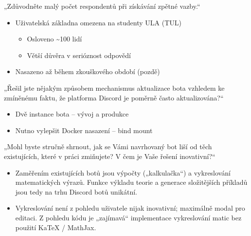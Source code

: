 \documentclass[FM]{tulpresentation} %
\begin{document}
	\TULendframe

	\begin{frame}
		\bigskip
		„Zdůvodněte malý počet respondentů při získávání zpětné vazby.“
		\bigskip
		\begin{itemize}
			\item Uživatelská základna omezena na studenty ULA (TUL)
			\begin{itemize}
				\item Osloveno \textasciitilde100 lidí
				\item Větší důvěra v serióznost odpovědí
			\end{itemize}
			\item Nasazeno až během zkouškového období (pozdě)
		\end{itemize}
	\end{frame}
	
	\begin{frame}
		\bigskip
		„Řešil jste nějakým způsobem mechanismus aktualizace bota vzhledem ke zmíněnému faktu, že platforma Discord je poměrně často aktualizována?“
		\bigskip
		\begin{itemize}
			\item Dvě instance bota – vývoj a produkce
			\item Nutno vylepšit Docker nasazení – bind mount
		\end{itemize}
	\end{frame}
	
	\begin{frame}
		\bigskip
		„Mohl byste stručně shrnout, jak se Vámi navrhovaný bot liší od těch existujících, které v práci zmiňujete? V
		čem je Vaše řešení inovativní?“
		\bigskip
		\begin{itemize}		
		\item Zaměřením existujících botů jsou výpočty („kalkulačka“) a vykreslování matematických výrazů. Funkce výkladu teorie a generace složitějších příkladů jsou tedy na trhu Discord botů unikátní.
		\item Vykreslování není z pohledu uživatele nijak inovativní; maximálně modal pro editaci. Z pohledu kódu je „zajímavá“ implementace vykreslování matic bez použití KaTeX / MathJax.
		\end{itemize}
	\end{frame}
	
\end{document}
